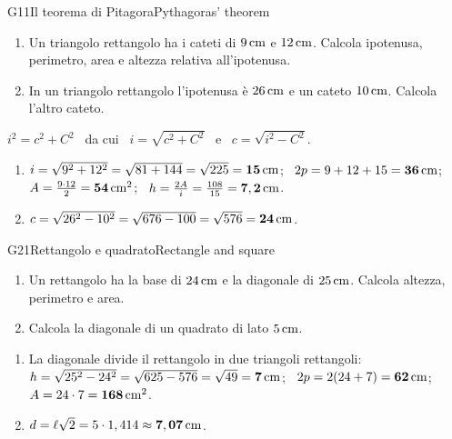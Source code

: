 \begin{esercizio}{G1}{1}{Il teorema di Pitagora}{Pythagoras' theorem}
\begin{enumerate}
\item Un triangolo rettangolo ha i cateti di $9\,\mathrm{cm}$ e $12\,\mathrm{cm}$. Calcola ipotenusa, perimetro, area e altezza relativa all'ipotenusa.
\item In un triangolo rettangolo l'ipotenusa è $26\,\mathrm{cm}$ e un cateto $10\,\mathrm{cm}$. Calcola l'altro cateto.
\end{enumerate}
\end{esercizio}
\begin{solbox}
$i^2=c^2+C^2$ \ da cui \ $i=\sqrt{c^2+C^2}$ \ e \ $c=\sqrt{i^2-C^2}$. 
\begin{enumerate}
\item $i=\sqrt{9^2+12^2}=\sqrt{81+144}=\sqrt{225}=\mathbf{15\,\mathrm{cm}}$; \ $2p=9+12+15=\mathbf{36\,\mathrm{cm}}$; \ $A=\frac{9\cdot12}{2}=\mathbf{54\,\mathrm{cm^2}}$; \ $h=\frac{2A}{i}=\frac{108}{15}=\mathbf{7,2\,\mathrm{cm}}$.
\item $c=\sqrt{26^2-10^2}=\sqrt{676-100}=\sqrt{576}=\mathbf{24\,\mathrm{cm}}$.
\end{enumerate}
\end{solbox}

\begin{esercizio}{G2}{1}{Rettangolo e quadrato}{Rectangle and square}
\begin{enumerate}
\item Un rettangolo ha la base di $24\,\mathrm{cm}$ e la diagonale di $25\,\mathrm{cm}$. Calcola altezza, perimetro e area.
\item Calcola la diagonale di un quadrato di lato $5\,\mathrm{cm}$.
\end{enumerate}
\end{esercizio}
\begin{solbox}
\begin{enumerate}
\item La diagonale divide il rettangolo in due triangoli rettangoli: $h=\sqrt{25^2-24^2}=\sqrt{625-576}=\sqrt{49}=\mathbf{7\,\mathrm{cm}}$; \ $2p=2(24+7)=\mathbf{62\,\mathrm{cm}}$; \ $A=24\cdot7=\mathbf{168\,\mathrm{cm^2}}$.
\item $d=\ell\sqrt2=5\cdot1,414\approx\mathbf{7,07\,\mathrm{cm}}$.
\end{enumerate}
\end{solbox}

